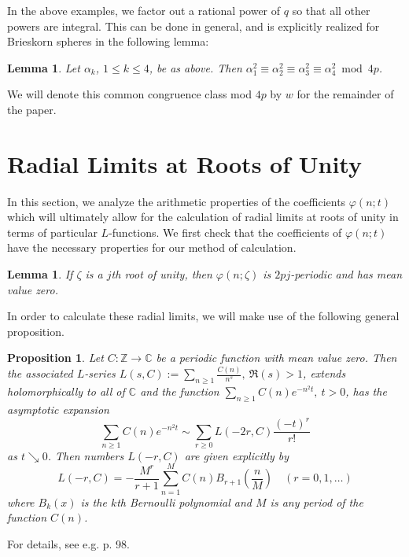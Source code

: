 \documentclass[11pt,letterpaper]{amsart}
\theoremstyle{definition}
\theoremstyle{plain}
\newtheorem{lemma}[theorem]{Lemma}
\newtheorem{prop}[theorem]{Proposition}
\numberwithin{equation}{section}
\theoremstyle{example}
\begin{document}
In the above examples, we factor out a rational power of $q$ so that all other powers are integral. This can be done in general, and is explicitly realized for Brieskorn spheres in the following lemma:

\begin{lemma}\label{lem: congruence class}
Let $\alpha_k$, $1 \leq k \leq 4$, be as above. Then $\alpha_1^2 \equiv \alpha_2^2 \equiv \alpha_3^2 \equiv \alpha_4^2 \bmod{4p}$.
\end{lemma}
We will denote this common congruence class mod $4p$ by $w$ for the remainder of the paper.

\section{Radial Limits at Roots of Unity}\label{sec: radial limits}

In this section, we analyze the arithmetic properties of the coefficients $\varphi(n;t)$ which will ultimately allow for the calculation of radial limits at roots of unity in terms of particular $L$-functions. We first check that the coefficients of $\varphi(n;t)$ have the necessary properties for our method of calculation.

\begin{lemma} If $\zeta$ is a $j$th root of unity, then $\varphi(n; \zeta)$ is $2pj$-periodic and has mean value zero.
\end{lemma}
In order to calculate these radial limits, we will make use of the following general proposition. 

\begin{prop} \label{prop: mellin limits}
Let $C \colon \mathbb{Z} \to \mathbb{C}$ be a periodic function with mean value zero. Then the associated $L$-series $L(s, C) := \sum_{n \geq 1}\frac{C(n)}{n^s}, \ \Re(s) > 1$, extends holomorphically to all of $\mathbb{C}$ and the function $\sum_{n \geq 1} C(n)e^{-n^2t}, \ t > 0$, has the asymptotic expansion
\[\sum_{n \geq 1} C(n)e^{-n^2t} \sim \sum_{r \geq 0} L(-2r, C) \frac{(-t)^r}{r!}
\]
as $t \searrow 0$. Then numbers $L(-r,C)$ are given explicitly by 
\[L(-r, C) = -\frac{M^r}{r+1} \sum_{n=1}^M C(n) B_{r+1}\left(\frac{n}{M}\right) \quad (r=0, 1, \dots)
\]
where $B_k(x)$ is the $k$th Bernoulli polynomial and $M$ is any period of the function $C(n)$. 
\end{prop}

For details, see e.g. \cite{lawrencezagier} p. 98.
\end{document}
